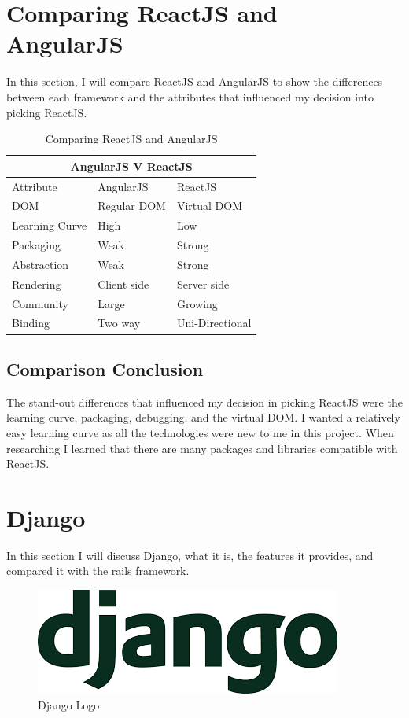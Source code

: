 \section{Comparing ReactJS and AngularJS}
In this section, I will compare ReactJS and AngularJS to show the differences between each framework and the attributes that influenced my decision into picking ReactJS. 

\begin{center}
\begin{table}[h]
 \begin{tabular}{ |p{3cm}||p{4cm}|p{4cm}|  }
 \hline
 \multicolumn{3}{|c|}{AngularJS V ReactJS} \\
 \hline
 Attribute & AngularJS & ReactJS \\ [0.7ex] 
 \hline
 DOM & Regular DOM & Virtual DOM  \\
 \hline
 Learning Curve & High & Low  \\
 \hline
 Packaging & Weak & Strong  \\
 \hline
 Abstraction & Weak & Strong \\
 \hline
 Rendering & Client side & Server side \\
 \hline
 Community & Large & Growing \\
 \hline
 Binding & Two way & Uni-Directional  \\ [1ex] 
 \hline
\end{tabular}
\caption{\label{tab:comparing}Comparing ReactJS and AngularJS \cite{kumar2016comparative} }
\end{table}
\end{center}

\subsection{Comparison Conclusion}
The stand-out differences that influenced my decision in picking ReactJS were the learning curve, packaging, debugging, and the virtual DOM. I wanted a relatively easy learning curve as all the technologies were new to me in this project. When researching I learned that there are many packages and libraries compatible with ReactJS.

\section{Django}
In this section I will discuss Django, what it is, the features it provides, and compared it with the rails framework.


\begin{figure}[h]
\centering
\includegraphics[scale=0.3]{img/django.png}
\caption{Django Logo}
\label{Django}
\end{figure}

